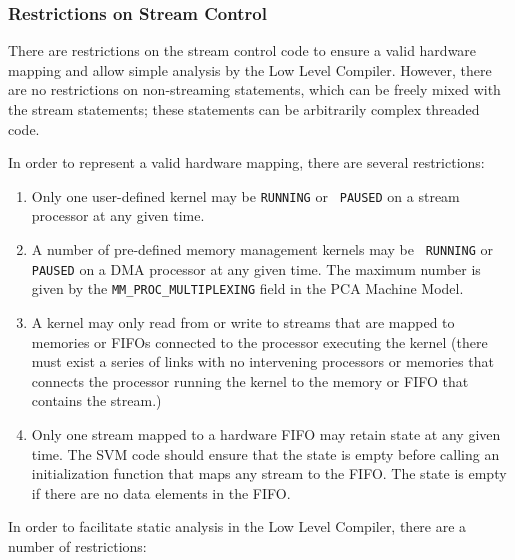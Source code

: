 \subsubsection{Restrictions on Stream Control}

There are restrictions on the stream control code to ensure a valid
hardware mapping and allow simple analysis by the Low Level
Compiler. However, there are no restrictions on non-streaming
statements, which can be freely mixed with the stream statements;
these statements can be arbitrarily complex threaded code.

In order to represent a valid hardware mapping, there are several restrictions:

\renewcommand{\labelenumi}{A\theenumi.}

\begin{enumerate}

\item Only one user-defined kernel may be {\tt RUNNING} or {\tt
PAUSED} on a stream processor at any given time.

\item A number of pre-defined memory management kernels may be {\tt
RUNNING} or {\tt PAUSED} on a DMA processor at any given time.  The
maximum number is given by the {\tt MM\_PROC\_MULTIPLEXING} field in
the PCA Machine Model.

\item A kernel may only read from or write to streams that are mapped
to memories or FIFOs connected to the processor executing the kernel
(there must exist a series of links with no intervening processors or
memories that connects the processor running the kernel to the memory
or FIFO that contains the stream.)

\item Only one stream mapped to a hardware FIFO may retain state at
any given time. The SVM code should ensure that the state is empty
before calling an initialization function that maps any stream to the
FIFO.  The state is empty if there are no data elements in the FIFO.

\end{enumerate}

\clearpage
\noindent In order to facilitate static analysis in the Low Level
Compiler, there are a number of restrictions:

\renewcommand{\labelenumi}{B\theenumi.}

